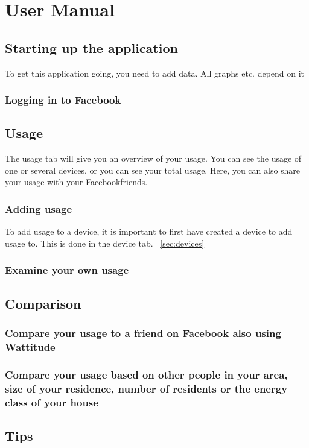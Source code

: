 \chapter{User Manual}

\section{Starting up the application}
To get this application going, you need to add data. All graphs etc. depend on it
\subsection{Logging in to Facebook}

\section{Usage}
The usage tab will give you an overview of your usage. You can see the usage of one or several devices, or you can see your total usage. Here, you can also share your usage with your Facebookfriends.
\subsection{Adding usage}
To add usage to a device, it is important to first have created a device to add usage to. This is done in the device tab. ~\ref{sec:devices}
\subsection{Examine your own usage}

\section{Comparison}
\subsection{Compare your usage to a friend on Facebook also using Wattitude}
\subsection{Compare your usage based on other people in your area, size of your residence, number of residents or the energy class of your house}

\section{Tips}
